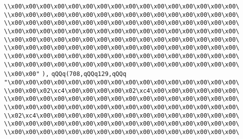 \verb|\\x00\x00\x00\x00\x00\x00\x00\x00\x00\x00\x00\x00\x00\x00\x00\x00\|\newline
\verb|\\x00\x00\x00\x00\x00\x00\x00\x00\x00\x00\x00\x00\x00\x00\x00\x00\|\newline
\verb|\\x00\x00\x00\x00\x00\x00\x00\x00\x00\x00\x00\x00\x00\x00\x00\x00\|\newline
\verb|\\x00\x00\x00\x00\x00\x00\x00\x00\x00\x00\x00\x00\x00\x00\x00\x00\|\newline
\verb|\\x00\x00\x00\x00\x00\x00\x00\x00\x00\x00\x00\x00\x00\x00\x00\x00\|\newline
\verb|\\x00\x00\x00\x00\x00\x00\x00\x00\x00\x00\x00\x00\x00\x00\x00\x00\|\newline
\verb|\\x00\x00\x00\x00\x00\x00\x00\x00\x00\x00\x00\x00\x00\x00\x00\x00\|\newline
\verb|\\x00\x00\x00\x00\x00\x00\x00\x00\x00\x00\x00\x00\x00\x00\x00\x00\|\newline
\verb|\\x00\x00"|\newline
\verb|),|\newline
\verb|qQQq(708,qQQq129,qQQq|\newline
\verb|"\x00\x00\x00\x00\x00\x00\x00\x00\x00\x00\x00\x00\x00\x00\x00\x00\|\newline
\verb|\\x00\x00\x02\xc4\x00\x00\x00\x00\x02\xc4\x00\x00\x00\x00\x00\x00\|\newline
\verb|\\x00\x00\x00\x00\x00\x00\x00\x00\x00\x00\x00\x00\x00\x00\x00\x00\|\newline
\verb|\\x00\x00\x00\x00\x00\x00\x00\x00\x00\x00\x00\x00\x00\x00\x00\x00\|\newline
\verb|\\x02\xc4\x00\x00\x00\x00\x00\x00\x00\x00\x00\x00\x00\x00\x00\x00\|\newline
\verb|\\x00\x00\x00\x00\x00\x00\x00\x00\x00\x00\x00\x00\x00\x00\x00\x00\|\newline
\verb|\\x00\x00\x00\x00\x00\x00\x00\x00\x00\x00\x00\x00\x00\x00\x00\x00\|\newline
